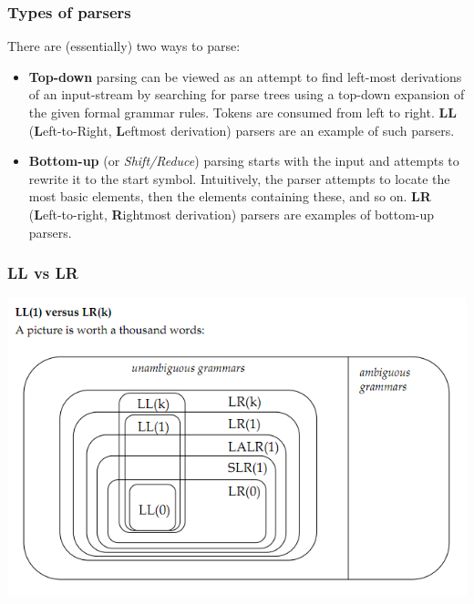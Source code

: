 \documentclass{beamer}
\begin{document}
\begin{frame}
  \frametitle{Types of parsers}
There are (essentially) two ways to parse:
\begin{itemize}
  \item \textbf{Top-down} parsing can be viewed as an attempt to find left-most
derivations of an input-stream by searching for parse trees using a top-down
expansion of the given formal grammar rules. Tokens are consumed from left to
right. \textbf{LL} (\textbf{L}eft-to-Right, \textbf{L}eftmost derivation)
parsers are an example of such parsers.

  \item \textbf{Bottom-up} (or \textit{Shift/Reduce}) parsing starts with the
input and attempts to rewrite it to the start symbol.  Intuitively, the parser
attempts to locate the most basic elements, then the elements containing these,
and so on. \textbf{LR} (\textbf{L}eft-to-right, \textbf{R}ightmost derivation)
parsers are examples of bottom-up parsers.
\end{itemize}
\end{frame}

\begin{frame}
  \frametitle{LL vs LR}
  \begin{center}
    \includegraphics[scale=0.47]{LLLR}
  \end{center}
\end{frame}
\end{document}
